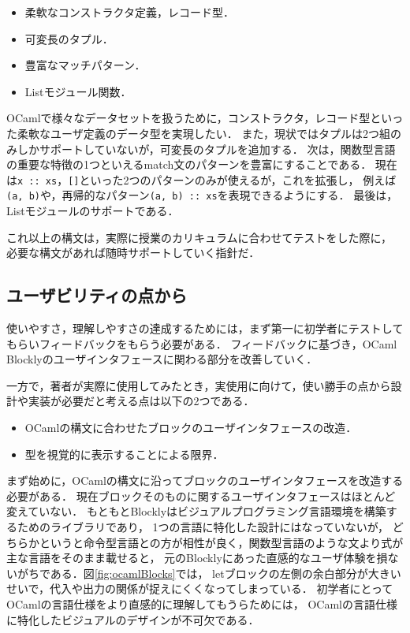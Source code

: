 \begin{itemize}
  \item 柔軟なコンストラクタ定義，レコード型．
  \item 可変長のタプル．
  \item 豊富なマッチパターン．
  \item Listモジュール関数．
\end{itemize}

OCamlで様々なデータセットを扱うために，コンストラクタ，レコード型といった柔軟なユーザ定義のデータ型を実現したい．
また，現状ではタプルは2つ組のみしかサポートしていないが，可変長のタプルを追加する．
次は，関数型言語の重要な特徴の1つといえるmatch文のパターンを豊富にすることである．
現在は{\tt x ::\ xs}，{\tt []}といった2つのパターンのみが使えるが，これを拡張し，
例えば{\tt (a, b)}や，再帰的なパターン{\tt (a, b) ::\ xs}を表現できるようにする．
最後は，Listモジュールのサポートである．

これ以上の構文は，実際に授業のカリキュラムに合わせてテストをした際に，
必要な構文があれば随時サポートしていく指針だ．

\subsection*{ユーザビリティの点から}

使いやすさ，理解しやすさの達成するためには，まず第一に初学者にテストしてもらいフィードバックをもらう必要がある．
フィードバックに基づき，OCaml Blocklyのユーザインタフェースに関わる部分を改善していく．

一方で，著者が実際に使用してみたとき，実使用に向けて，使い勝手の点から設計や実装が必要だと考える点は以下の2つである．%
\begin{itemize}
 \item OCamlの構文に合わせたブロックのユーザインタフェースの改造．
 \item 型を視覚的に表示することによる限界．
\end{itemize}

まず始めに，OCamlの構文に沿ってブロックのユーザインタフェースを改造する必要がある．
現在ブロックそのものに関するユーザインタフェースはほとんど変えていない．
もともとBlocklyはビジュアルプログラミング言語環境を構築するためのライブラリであり，
1つの言語に特化した設計にはなっていないが，
どちらかというと命令型言語との方が相性が良く，関数型言語のような文より式が主な言語をそのまま載せると，
元のBlocklyにあった直感的なユーザ体験を損ないがちである．図\ref{fig:ocamlBlocks}では，
letブロックの左側の余白部分が大きいせいで，代入や出力の関係が捉えにくくなってしまっている．
初学者にとってOCamlの言語仕様をより直感的に理解してもうらためには，
OCamlの言語仕様に特化したビジュアルのデザインが不可欠である．

